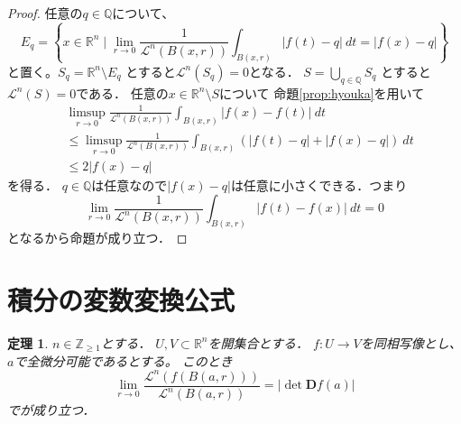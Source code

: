\documentclass[leqno, a4paper, 12pt]{jsarticle}
\newtheorem{thm}{定理}
\newcommand{\zz}{\mathbb{Z}}
\newcommand{\qq}{\mathbb{Q}}
\newcommand{\rr}{\mathbb{R}}
\newcommand{\ddd}{\mathbf{D}}
\begin{document}
\begin{proof}
任意の$q\in \qq$について、
\[
E_{q}=\left\{x\in \rr^n\mid 
\lim_{r\to 0}\frac{1}{\mathcal{L}^{n}(B(x,r))}\int_{B(x,r)}|f(t)-q|\ dt=|f(x)-q|
\right\}
\]
と置く。$S_{q}=\rr^n\setminus E_{q}$
とすると$\mathcal{L}^{n}(S_{q})=0$となる．
$S=\bigcup_{q\in \qq}S_{q}$
とすると$\mathcal{L}^{n}(S)=0$である．
任意の$x\in \rr^n\setminus S$について
命題\ref{prop:hyouka}を用いて
\begin{align*}
&\limsup_{r\to 0}\frac{1}{\mathcal{L}^{n}(B(x,r))}\int_{B(x,r)}|f(x)-f(t)|\ dt
\\
&\le 
\limsup_{r\to 0}\frac{1}{\mathcal{L}^{n}(B(x,r))}\int_{B(x,r)}(
|f(t)-q|+|f(x)-q|)\ dt\\
&\le 2|f(x)-q|
\end{align*}
を得る．
$q\in \qq$は任意なので$|f(x)-q|$は任意に小さくできる．つまり
\[
\lim_{r\to 0}\frac{1}{\mathcal{L}^{n}(B(x,r))}\int_{B(x,r)} |f(t)-f(x)|\ dt=0
\]
となるから命題が成り立つ．
\end{proof}

\section{積分の変数変換公式}



\begin{thm}\label{thm:jdet}
$n\in \zz_{\ge 1}$とする．
$U, V\subset \rr^{n}$を開集合とする．
$f:U\to V$を同相写像とし、$a$で全微分可能であるとする。
このとき
\[
\lim_{r\to 0}\frac{\mathcal{L}^{n}(f(B(a,r)))}{\mathcal{L}^{n}(B(a,r))}=|\det \ddd f(a)|
\]
でが成り立つ．
\end{thm}
\end{document}

